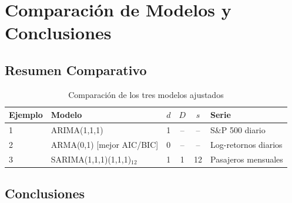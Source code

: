 \documentclass[12pt, a4paper]{article}
\begin{document}
\section{Comparación de Modelos y Conclusiones}

\subsection{Resumen Comparativo}

\begin{table}[H]
\centering
\caption{Comparación de los tres modelos ajustados}
\begin{tabular}{llcccl}
\toprule
\textbf{Ejemplo} & \textbf{Modelo} & \textbf{$d$} & \textbf{$D$} & \textbf{$s$} & \textbf{Serie} \\
\midrule
1 & ARIMA(1,1,1)                   & 1 & -- & -- & S\&P 500 diario \\
2 & ARMA(0,1) [mejor AIC/BIC]      & 0 & -- & -- & Log-retornos diarios \\
3 & SARIMA(1,1,1)(1,1,1)$_{12}$   & 1 & 1  & 12 & Pasajeros mensuales \\
\bottomrule
\end{tabular}
\end{table}

\subsection{Conclusiones}
\end{document}
